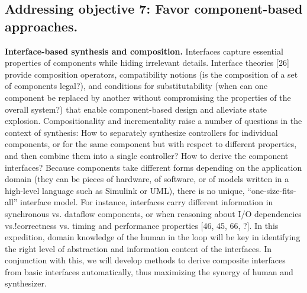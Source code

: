 \subsection{Addressing objective 7: Favor component-based approaches.}  



\textbf{Interface-based synthesis and composition.} Interfaces capture essential properties of components while hiding irrelevant details. Interface theories [26] provide composition operators, compatibility notions (is the composition of a set of components legal?), and conditions for substitutability (when can one component be replaced by another without compromising the properties of the overall system?) that enable component-based design and alleviate state explosion. Compositionality and incrementality raise a number of questions in the context of synthesis: How to separately synthesize controllers for individual components, or for the same component but with respect to different properties, and then combine them into a single controller? How to derive the component interfaces? Because components take different forms depending on the application domain (they can be pieces of hardware, of software, or of models written in a high-level language such as Simulink or UML), there is no unique, “one-size-fits-all” interface model. For instance, interfaces carry different information in synchronous vs. dataflow components, or when reasoning about I/O dependencies vs.!correctness vs. timing and performance properties [46, 45, 66, ?]. In this expedition, domain knowledge of the human in the loop will be key in identifying the right level of abstraction and information content of the interfaces. In conjunction with this, we will develop methods to derive composite interfaces from basic interfaces automatically, thus maximizing the synergy of human and synthesizer.


